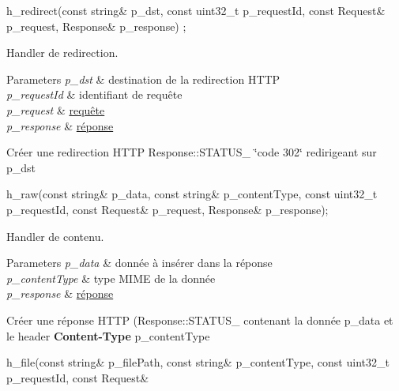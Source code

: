 \begin{DoxyItemize}
\item 
\begin{DoxyCode}
h\_redirect(\textcolor{keyword}{const} \textcolor{keywordtype}{string}& p\_dst, \textcolor{keyword}{const} uint32\_t p\_requestId, \textcolor{keyword}{const} Request& p\_request, Response& p\_response)
      ; 
\end{DoxyCode}
 Handler de redirection. 
\begin{DoxyParams}{Parameters}
{\em p\+\_\+dst} & destination de la redirection H\+T\+TP \\
\hline
{\em p\+\_\+request\+Id} & identifiant de requête \\
\hline
{\em p\+\_\+request} & \hyperlink{classxtd_1_1network_1_1http_1_1Request}{requête} \\
\hline
{\em p\+\_\+response} & \hyperlink{classxtd_1_1network_1_1http_1_1Response}{réponse}\\
\hline
\end{DoxyParams}
Créer une redirection H\+T\+TP Response\+::\+S\+T\+A\+T\+U\+S\+\_ \char`\"{}code 302\char`\"{} redirigeant sur p\+\_\+dst
\item 
\begin{DoxyCode}
h\_raw(\textcolor{keyword}{const} \textcolor{keywordtype}{string}& p\_data, \textcolor{keyword}{const} \textcolor{keywordtype}{string}& p\_contentType, \textcolor{keyword}{const} uint32\_t p\_requestId, \textcolor{keyword}{const} Request& 
      p\_request, Response& p\_response); 
\end{DoxyCode}
 Handler de contenu. 
\begin{DoxyParams}{Parameters}
{\em p\+\_\+data} & donnée à insérer dans la réponse \\
\hline
{\em p\+\_\+content\+Type} & type M\+I\+ME de la donnée \\
\hline
{\em p\+\_\+response} & \hyperlink{classxtd_1_1network_1_1http_1_1Response}{réponse}\\
\hline
\end{DoxyParams}
Créer une réponse H\+T\+TP (Response\+::\+S\+T\+A\+T\+U\+S\+\_ contenant la donnée p\+\_\+data et le header {\bfseries Content-\/\+Type} p\+\_\+content\+Type
\item 
\begin{DoxyCode}
h\_file(\textcolor{keyword}{const} \textcolor{keywordtype}{string}& p\_filePath, \textcolor{keyword}{const} \textcolor{keywordtype}{string}& p\_contentType, \textcolor{keyword}{const} uint32\_t p\_requestId, \textcolor{keyword}{const} Request& 

\end{DoxyCode}
\end{DoxyItemize}
